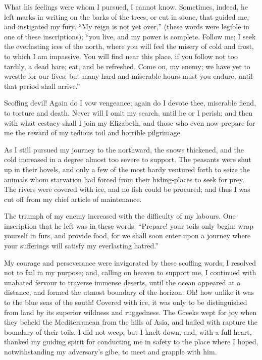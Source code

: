 What his feelings were whom I pursued,
I cannot know. Sometimes, indeed,
he left marks in writing on the
barks of the trees, or cut in stone, that
guided me, and instigated my fury.
``My reign is not yet over,'' (these words
were legible in one of these inscriptions);
``you live, and my power is
complete. Follow me; I seek the
everlasting ices of the north, where you
will feel the misery of cold and frost,
to which I am impassive. You will
find near this place, if you follow not
too tardily, a dead hare; eat, and be refreshed.
Come on, my enemy; we have
yet to wrestle for our lives; but many
hard and miserable hours must you
endure, until that period shall arrive.''

Scoffing devil! Again do I vow vengeance;
again do I devote thee, miserable
fiend, to torture and death. Never
will I omit my search, until he or I
perish; and then with what ecstacy shall
I join my Elizabeth, and those who even
now prepare for me the reward of my
tedious toil and horrible pilgrimage.

As I still pursued my journey to the
northward, the snows thickened, and
the cold increased in a degree almost
too severe to support. The peasants
were shut up in their hovels, and only
a few of the most hardy ventured forth
to seize the animals whom starvation
had forced from their hiding-places to
seek for prey. The rivers were covered
with ice, and no fish could be procured;
and thus I was cut off from my chief
article of maintenance.

The triumph of my enemy increased
with the difficulty of my labours. One
inscription that he left was in these
words: ``Prepare! your toils only begin:
wrap yourself in furs, and provide
food, for we shall soon enter upon
a journey where your sufferings will
satisfy my everlasting hatred.''

My courage and perseverance were
invigorated by these scoffing words; I
resolved not to fail in my purpose;
and, calling on heaven to support me,
I continued with unabated fervour to
traverse immense deserts, until the
ocean appeared at a distance, and
formed the utmost boundary of the horizon.
Oh! how unlike it was to the
blue seas of the south! Covered with
ice, it was only to be distinguished from
land by its superior wildness and ruggedness.
The Greeks wept for joy
when they beheld the Mediterranean
from the hills of Asia, and hailed with
rapture the boundary of their toils. I
did not weep; but I knelt down, and,
with a full heart, thanked my guiding
spirit for conducting me in safety to
the place where I hoped, notwithstanding
my adversary's gibe, to meet and
grapple with him.

